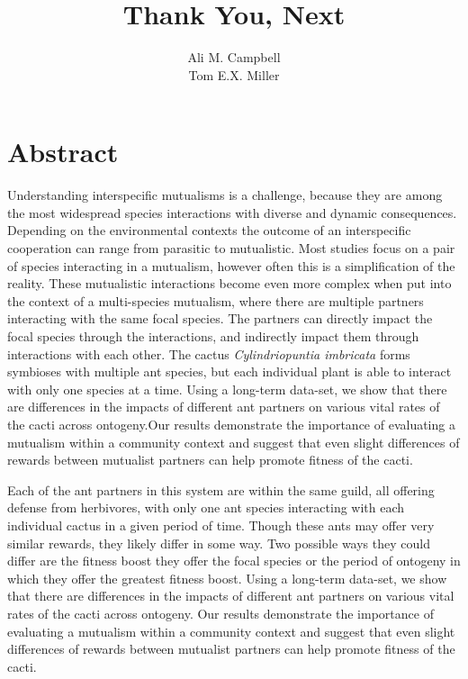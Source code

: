 \documentclass[12pt,a4paper]{article}
\title{Thank You, Next}
\author{Ali M. Campbell\\
Tom E.X. Miller}
\begin{document}
	\maketitle
	
	\section*{Abstract}
	
	Understanding interspecific mutualisms is a challenge, because they are among the most widespread species interactions with diverse and dynamic consequences. Depending on the environmental contexts the outcome of an interspecific cooperation can range from parasitic to mutualistic. Most studies focus on a pair of species interacting in a mutualism, however often this is a simplification of the reality. These mutualistic interactions become even more complex when put into the context of a multi-species mutualism, where there are multiple partners interacting with the same focal species. The partners can directly impact the focal species through the interactions, and indirectly impact them through interactions with each other. The cactus \textit{Cylindriopuntia imbricata} forms symbioses with multiple ant species, but each individual plant is able to interact with only one species at a time. Using a long-term data-set, we show that there are differences in the impacts of different ant partners on various vital rates of the cacti across ontogeny.Our results demonstrate the importance of evaluating a mutualism within a community context and suggest that even slight differences of rewards between mutualist partners can help promote fitness of the cacti. 
	
	Each of the ant partners in this system are within the same guild, all offering defense from herbivores, with only one ant species interacting with each individual cactus in a given period of time. Though these ants may offer very similar rewards, they likely differ in some way. Two possible ways they could differ are the fitness boost they offer the focal species or the period of ontogeny in which they offer the greatest fitness boost. Using a long-term data-set, we show that there are differences in the impacts of different ant partners on various vital rates of the cacti across ontogeny. Our results demonstrate the importance of evaluating a mutualism within a community context and suggest that even slight differences of rewards between mutualist partners can help promote fitness of the cacti. 
	
\end{document}
